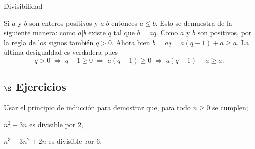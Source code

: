 \begin{section}{Divisibilidad}
\begin{observacion*}
    Si $a$ y $b$ son enteros positivos y $a|b$  entonces $a \le b$. Esto se demuestra de la siguiente manera: como $a|b$  existe $q$  tal que $b = aq$. Como $a$ y $b$ son positivos, por la regla de los signos  también $q >0$. Ahora bien $b = aq = a(q-1) + a \ge a$. La última desigualdad es verdadera pues 
    $$q >0 \; \Rightarrow  \; q-1 \ge 0\; \Rightarrow \; a(q-1) \ge 0 \; \Rightarrow \; a(q-1) + a \ge a .
    $$ 
\end{observacion*}

\subsection*{$\S$ Ejercicios}
\begin{enumex}
    \item Usar el principio de inducción para demostrar que, para todo $n\ge0$ 
    se cumplen;
    \begin{enumex}
        \item $n^2+3n$ es divisible por $2$,
        
        \item $n^3+3n^2+2n$ es divisible por $6$. 
    \end{enumex}
\end{enumex}

\end{section}


